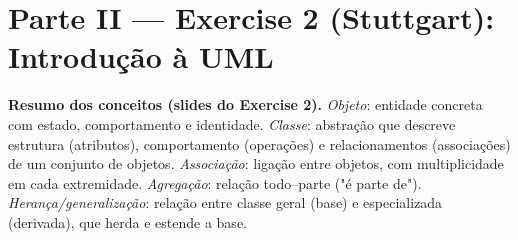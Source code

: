 \documentclass[11pt,a4paper]{article}
\begin{document}
\section{Parte II — Exercise 2 (Stuttgart): Introdução à UML}

\begin{nota}
\textbf{Resumo dos conceitos (slides do Exercise 2).} \textit{Objeto}: entidade
concreta com estado, comportamento e identidade. \textit{Classe}: abstração que
descreve estrutura (atributos), comportamento (operações) e relacionamentos
(associações) de um conjunto de objetos. \textit{Associação}: ligação entre
objetos, com multiplicidade em cada extremidade. \textit{Agregação}: relação
todo–parte ("é parte de"). \textit{Herança/generalização}: relação entre classe
geral (base) e especializada (derivada), que herda e estende a base.
\end{nota}

\end{document}

